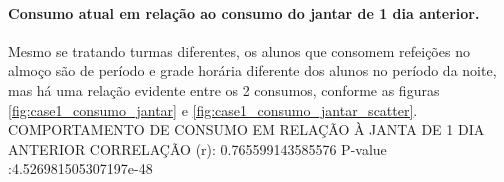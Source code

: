\documentclass[	12pt, Times, openright, twoside, a4paper, english, brazil]{abntex2}
\begin{document}
                \paragraph{Consumo atual em relação ao consumo do jantar de 1 dia anterior.}
                    Mesmo se tratando turmas diferentes,  os alunos que consomem refeições no almoço são de período e grade horária diferente dos alunos no período da noite, mas há uma relação evidente entre os 2 consumos, conforme as figuras \ref{fig:case1_consumo_jantar} e \ref{fig:case1_consumo_jantar_scatter}.\newline
                    COMPORTAMENTO DE CONSUMO EM RELAÇÃO À JANTA DE 1 DIA ANTERIOR\newline
                    CORRELAÇÃO (r): 0.765599143585576\newline
                    P-value :4.526981505307197e-48\newline
                    \begin{figure}[H]
                    \end{figure}
                    \begin{figure}[H]
                    \end{figure}
\end{document}
